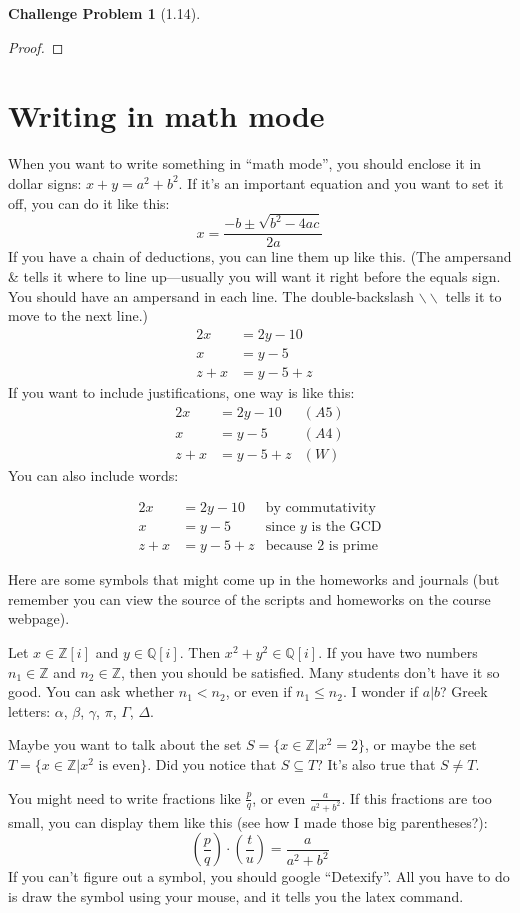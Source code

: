 \documentclass[11pt]{article}
\theoremstyle{quest}
\newtheorem*{challengeproblem}{Challenge Problem}
\newcommand{\Q}{\mathbb{Q}}
\newcommand{\Z}{\mathbb{Z}}
\begin{document}
\begin{challengeproblem}[1.14]

\end{challengeproblem}
\begin{proof}

\end{proof}




\section*{Writing in math mode}
When you want to write something in ``math mode'', you should enclose it in dollar signs: $x+y=a^2+b^2$.
If it's an important equation and you want to set it off, you can do it like this: \[x = \frac{-b \pm \sqrt{b^2-4ac} }{2a}\]
If you have a chain of deductions, you can line them up like this. (The ampersand \& tells it where to line up---usually you will want it right before the equals sign. You should have an ampersand in each line. The double-backslash $\backslash\backslash$ tells it to move to the next line.)
\begin{align*}
  2x &= 2y-10&\\
  x &=y-5 &\\
  z+x &= y-5+z
\end{align*}
If you want to include justifications, one way is like this:
\begin{align*}
  2x &= 2y-10 & (A5)\\
  x &=y-5  & (A4)\\
  z+x &= y-5+z & (W)
\end{align*}
You can also include words:

\begin{align*}
  2x &= 2y-10 & \text{by commutativity} \\
  x &=y-5  & \text{since $y$ is the GCD}\\
  z+x &= y-5+z & \text{because 2 is prime}
\end{align*}

Here are some symbols that might come up in the homeworks and journals (but remember you can view the source of the scripts and homeworks on the course webpage).

Let $x\in \Z[i]$ and $y\in \Q[i]$. Then $x^2+y^2\in \Q[i]$. If you have two numbers $n_1\in \Z$ and $n_2\in \Z$, then you should be satisfied. Many students don't have it so good. You can ask whether $n_1 < n_2$, or even if $n_1 \leq n_2$. I wonder if $a|b$? Greek letters: $\alpha$, $\beta$, $\gamma$, $\pi$, $\Gamma$, $\Delta$.

Maybe you want to talk about the set $S=\{ x\in \Z | x^2 = 2\}$, or maybe the set $T=\{ x\in \Z | x^2 \text{ is even}\}$. Did you notice that $S\subseteq T$? It's also true that $S \neq T$.

You might need to write fractions like $\frac{p}{q}$, or even $\frac{a}{a^2+b^2}$. If this fractions are too small, you can display them like this (see how I made those big parentheses?):
\[\left(\frac{p}{q}\right)\cdot \left(\frac{t}{u}\right) = \frac{a}{a^2+b^2}\]
If you can't figure out a symbol, you should google ``Detexify''. All you have to do is draw the symbol using your mouse, and it tells you the latex command.
\end{document}
